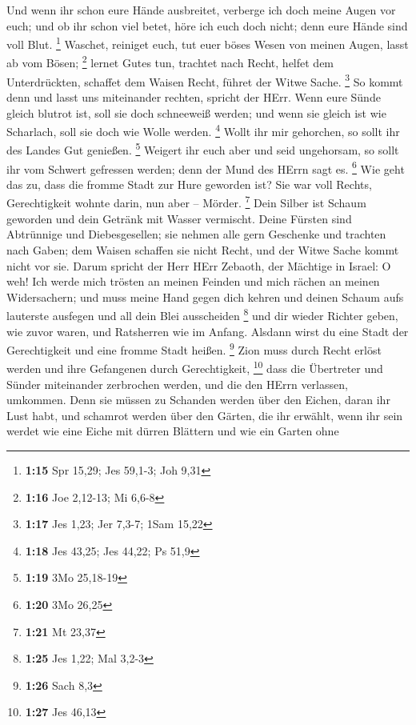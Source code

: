  Und wenn ihr schon eure Hände ausbreitet, verberge ich
doch meine Augen vor euch; und ob ihr schon viel betet, höre ich euch
doch nicht; denn eure Hände sind voll Blut. \footnote{\textbf{1:15} Spr
  15,29; Jes 59,1-3; Joh 9,31}  Waschet, reiniget euch, tut
euer böses Wesen von meinen Augen, lasst ab vom Bösen; \footnote{\textbf{1:16}
  Joe 2,12-13; Mi 6,6-8}  lernet Gutes tun, trachtet nach
Recht, helfet dem Unterdrückten, schaffet dem Waisen Recht, führet der
Witwe Sache. \footnote{\textbf{1:17} Jes 1,23; Jer 7,3-7; 1Sam 15,22}
 So kommt denn und lasst uns miteinander rechten, spricht
der HErr. Wenn eure Sünde gleich blutrot ist, soll sie doch schneeweiß
werden; und wenn sie gleich ist wie Scharlach, soll sie doch wie Wolle
werden. \footnote{\textbf{1:18} Jes 43,25; Jes 44,22; Ps 51,9}
 Wollt ihr mir gehorchen, so sollt ihr des Landes Gut
genießen. \footnote{\textbf{1:19} 3Mo 25,18-19}  Weigert
ihr euch aber und seid ungehorsam, so sollt ihr vom Schwert gefressen
werden; denn der Mund des HErrn sagt es. \footnote{\textbf{1:20} 3Mo
  26,25}  Wie geht das zu, dass die fromme Stadt zur Hure
geworden ist? Sie war voll Rechts, Gerechtigkeit wohnte darin, nun aber
-- Mörder. \footnote{\textbf{1:21} Mt 23,37}  Dein Silber
ist Schaum geworden und dein Getränk mit Wasser vermischt. 
Deine Fürsten sind Abtrünnige und Diebesgesellen; sie nehmen alle gern
Geschenke und trachten nach Gaben; dem Waisen schaffen sie nicht Recht,
und der Witwe Sache kommt nicht vor sie.  Darum spricht der
Herr HErr Zebaoth, der Mächtige in Israel: O weh! Ich werde mich trösten
an meinen Feinden und mich rächen an meinen Widersachern; 
und muss meine Hand gegen dich kehren und deinen Schaum aufs lauterste
ausfegen und all dein Blei ausscheiden \footnote{\textbf{1:25} Jes 1,22;
  Mal 3,2-3}  und dir wieder Richter geben, wie zuvor
waren, und Ratsherren wie im Anfang. Alsdann wirst du eine Stadt der
Gerechtigkeit und eine fromme Stadt heißen. \footnote{\textbf{1:26} Sach
  8,3}  Zion muss durch Recht erlöst werden und ihre
Gefangenen durch Gerechtigkeit, \footnote{\textbf{1:27} Jes 46,13}
 dass die Übertreter und Sünder miteinander zerbrochen
werden, und die den HErrn verlassen, umkommen.  Denn sie
müssen zu Schanden werden über den Eichen, daran ihr Lust habt, und
schamrot werden über den Gärten, die ihr erwählt,  wenn ihr
sein werdet wie eine Eiche mit dürren Blättern und wie ein Garten ohne
